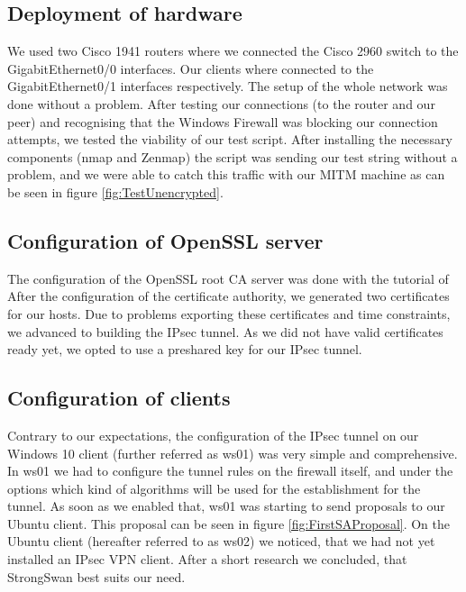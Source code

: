 \documentclass[a4paper]{report}
\begin{document}
\subsection{Deployment of hardware}
We used two Cisco 1941 routers where we connected the Cisco 2960 switch to the GigabitEthernet0/0 interfaces. Our clients where connected to the GigabitEthernet0/1 interfaces respectively. The setup of the whole network was done without a problem. After testing our connections (to the router and our peer) and recognising that the Windows Firewall was blocking our connection attempts, we tested the viability of our test script. After installing the necessary components (nmap and Zenmap) the script was sending our test string without a problem, and we were able to catch this traffic with our MITM machine as can be seen in figure \ref{fig:TestUnencrypted}. 

\subsection{Configuration of OpenSSL server}

The configuration of the OpenSSL root CA server was done with the tutorial of %
After the configuration of the certificate authority, we generated two certificates for our hosts. Due to problems exporting these certificates and time constraints, we advanced to building the IPsec tunnel. As we did not have valid certificates ready yet, we opted to use a preshared key for our IPsec tunnel.

\subsection{Configuration of clients}

Contrary to our expectations, the configuration of the IPsec tunnel on our Windows 10 client (further referred as ws01) was very simple and comprehensive. In ws01 we had to configure the tunnel rules on the firewall itself, and under the options which kind of algorithms will be used for the establishment for the tunnel. As soon as we enabled that, ws01 was starting to send proposals to our Ubuntu client. This proposal can be seen in figure \ref{fig:FirstSAProposal}.
On the Ubuntu client (hereafter referred to as ws02) we noticed, that we had not yet installed an IPsec VPN client. After a short research we concluded, that StrongSwan best suits our need.
\end{document}

